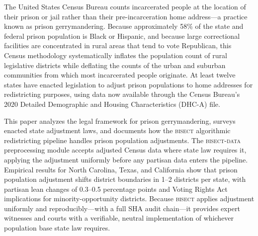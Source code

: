 The United States Census Bureau counts incarcerated people at the location of
their prison or jail rather than their pre-incarceration home address---a
practice known as prison gerrymandering. Because approximately 58\% of the
state and federal prison population is Black or Hispanic, and because large
correctional facilities are concentrated in rural areas that tend to vote
Republican, this Census methodology systematically inflates the population
count of rural legislative districts while deflating the counts of the urban
and suburban communities from which most incarcerated people originate.
At least twelve states have enacted legislation to adjust prison populations
to home addresses for redistricting purposes, using data now available through
the Census Bureau's 2020 Detailed Demographic and Housing Characteristics
(DHC-A) file.

This paper analyzes the legal framework for prison gerrymandering, surveys
enacted state adjustment laws, and documents how the \textsc{bisect}
algorithmic redistricting pipeline handles prison population adjustments.
The \textsc{bisect-data} preprocessing module accepts adjusted Census data
where state law requires it, applying the adjustment uniformly before any
partisan data enters the pipeline. Empirical results for North Carolina,
Texas, and California show that prison population adjustment shifts district
boundaries in 1--2 districts per state, with partisan lean changes of
0.3--0.5 percentage points and Voting Rights Act
implications for minority-opportunity districts. Because \textsc{bisect}
applies adjustment uniformly and reproducibly---with a full SHA audit
chain---it provides expert witnesses and courts with a verifiable,
neutral implementation of whichever population base state law requires.
